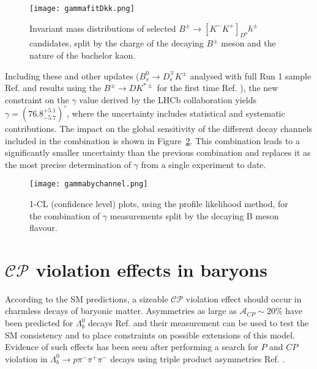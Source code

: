 \documentclass[12pt]{article}
\newcommand{\decay}[2]{\ensuremath{#1\!\to #2}\xspace}         %
\def\to                 {\ensuremath{\rightarrow}\xspace}
\def\Ppi         {\ensuremath{\pi}\xspace}
\def\Pb      {\ensuremath{b}\xspace}
\def\Pp      {\ensuremath{p}\xspace}
\def\pion   {{\ensuremath{\Ppi}}\xspace}
\def\PLambda      {\ensuremath{\Lambda}\xspace}
\def\Lz          {{\ensuremath{\PLambda}}\xspace}
\def\pip    {{\ensuremath{\pion^+}}\xspace}
\def\pim    {{\ensuremath{\pion^-}}\xspace}
\def\proton      {{\ensuremath{\Pp}}\xspace}
\def\bquark    {{\ensuremath{\Pb}}\xspace}
\def\Lb      {{\ensuremath{\Lz^0_\bquark}}\xspace}
\def\CP                {{\ensuremath{C\!P}}\xspace}
\def\P                 {{\ensuremath{\!P}}\xspace}
\def\Lbppipipi {\decay{\Lb}{\proton\pim\pip\pim}}
\begin{document}
\begin{figure}[htb]
\begin{center}
\texttt{[image: gammafitDkk.png]}
\caption{Invariant mass distributions of selected $B^\pm\rightarrow [K^-K^+]_{D^0}h^\pm$ candidates, split by the charge of the decaying $B^\pm$ meson and the nature of the bachelor kaon.}
\label{fig:Dkpifit}
\end{center}
\end{figure}

Including these and other updates ($B^0_s\rightarrow D^\mp_sK^\pm$ analysed with full Run 1 sample Ref. \cite{conf015} and results using the $B^\pm\rightarrow DK^{*\pm}$ for the first time Ref. \cite{conf014}),  the new constraint on the $\gamma$ value derived by the LHCb collaboration yields $\gamma = (76.8^{+5.1}_{-5.7})^\circ$, where the uncertainty includes statistical and systematic contributions. The impact on the global sensitivity of the different decay channels included in the combination is shown in Figure~\ref{fig:gamma}. This combination leads to a significantly smaller uncertainty than the previous combination and replaces it as the most precise determination of $\gamma$ from a single experiment to date.


\begin{figure}[htb]
\begin{center}
\texttt{[image: gammabychannel.png]}
\caption{1-CL (confidence level) plots, using the profile likelihood method, for the combination of $\gamma$ measurements split by the decaying B meson flavour.}
\label{fig:gamma}
\end{center}
\end{figure}


\section{$\mathcal{CP}$ violation effects in baryons}
According to the SM predictions, a sizeable $\mathcal{CP}$ violation effect should occur in charmless decays of baryonic matter. Asymmetries as large as $\mathcal{A}_{CP}\sim20\%$ have been predicted for $\Lambda_b^0$ decays Ref. \cite{Lbcpv} and their measurement can be used to test the SM consistency and to place constraints on possible extensions of this model. Evidence of such effects has been seen after performing a search for \P and \CP violation in \Lbppipipi decays using triple product asymmetries Ref. \cite{lbdecays}. 
\end{document}
